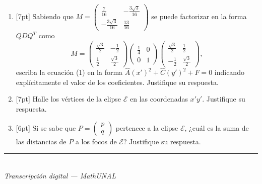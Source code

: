 \documentclass[11pt]{article}
\newcommand{\vect}[2]{\begin{pmatrix}#1\\#2\end{pmatrix}}
\newcommand{\examfooter}{%
  \vfill
  \rule{\linewidth}{0.4pt}\\[1pt]
  {\scriptsize\textit{Transcripción digital --- MathUNAL}\hfill\textcolor{unalblue}{\textbf{\thepage}}}
}
\begin{document}
\begin{enumerate}
\begin{enumerate}[label=(\alph*)]
\item{}[7pt] Sabiendo que $M=\begin{pmatrix}\frac{7}{16} & -\frac{3\sqrt{3}}{16}\\ -\frac{3\sqrt{3}}{16} & \frac{13}{16}\end{pmatrix}$ se puede factorizar en la forma $QDQ^T$ como
$$M=\begin{pmatrix}\frac{\sqrt{3}}{2} & -\frac{1}{2}\\ \frac{1}{2} & \frac{\sqrt{3}}{2}\end{pmatrix}\begin{pmatrix}\frac{1}{4} & 0\\ 0 & 1\end{pmatrix}\begin{pmatrix}\frac{\sqrt{3}}{2} & \frac{1}{2}\\ -\frac{1}{2} & \frac{\sqrt{3}}{2}\end{pmatrix},$$
escriba la ecuación (1) en la forma $\widehat{A}(x')^2+\widehat{C}(y')^2+F=0$ indicando explícitamente el valor de los coeficientes. Justifique su respuesta.
\item{}[7pt] Halle los vértices de la elipse $\mathcal{E}$ en las coordenadas $x'y'$. Justifique su respuesta.
\item{}[6pt] Si se sabe que $P=\vect{p}{q}$ pertenece a la elipse $\mathcal{E}$, ¿cuál es la suma de las distancias de $P$ a los focos de $\mathcal{E}$? Justifique su respuesta.
\end{enumerate}

\end{enumerate}

\examfooter
\end{document}
